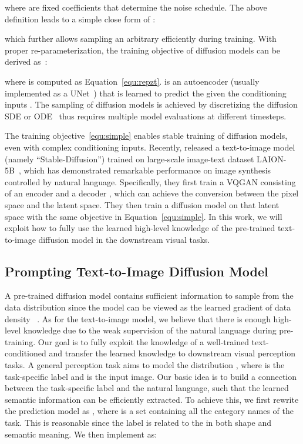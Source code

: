 \documentclass[10pt,twocolumn,letterpaper]{article}
\begin{document}
where  are fixed coefficients that determine the noise schedule. The above definition leads to a simple close form of :

which further allows sampling an arbitrary  efficiently during training. With proper re-parameterization, the training objective of diffusion models can be derived as~\cite{ho2020ddpm}:

where  is computed as Equation~\eqref{equ:repzt}.  is an autoencoder (usually implemented as a UNet~\cite{ronneberger2015unet}) that is learned to predict the  given the conditioning inputs . The sampling of diffusion models is achieved by discretizing the diffusion SDE or ODE~\cite{song2021score} thus requires multiple model evaluations at different timesteps.

The training objective~\eqref{equ:simple} enables stable training of diffusion models, even with complex conditioning inputs. Recently, \cite{rombach2022high} released a text-to-image model (namely ``Stable-Diffusion'') trained on large-scale image-text dataset LAION-5B~\cite{schuhmann2022laion}, which has demonstrated remarkable performance on image synthesis controlled by natural language. Specifically, they first train a VQGAN consisting of an encoder  and a decoder , which can achieve the conversion between the pixel space and the latent space. They then train a diffusion model on that latent space with the same objective in Equation~\eqref{equ:simple}. In this work, we will exploit how to fully use the learned high-level knowledge of the pre-trained text-to-image diffusion model in the downstream visual tasks.

\subsection{Prompting Text-to-Image Diffusion Model}
A pre-trained diffusion model contains sufficient information to sample from the data distribution since the model  can be viewed as the learned gradient of data density ~\cite{batzolis2021conditional}. As for the text-to-image model, we believe that there is enough high-level knowledge due to the weak supervision of the natural language during pre-training. Our goal is to fully exploit the knowledge of a well-trained text-conditioned  and transfer the learned knowledge to downstream visual perception tasks. A general perception task aims to model the distribution , where  is the task-specific label and  is the input image. Our basic idea is to build a connection between the task-specific label and the natural language, such that the learned semantic information can be efficiently extracted. To achieve this, we first rewrite the prediction model as , where  is a set containing all the category names of the task. This is reasonable since the label  is related to the  in both shape and semantic meaning. We then implement  as:
\end{document}
